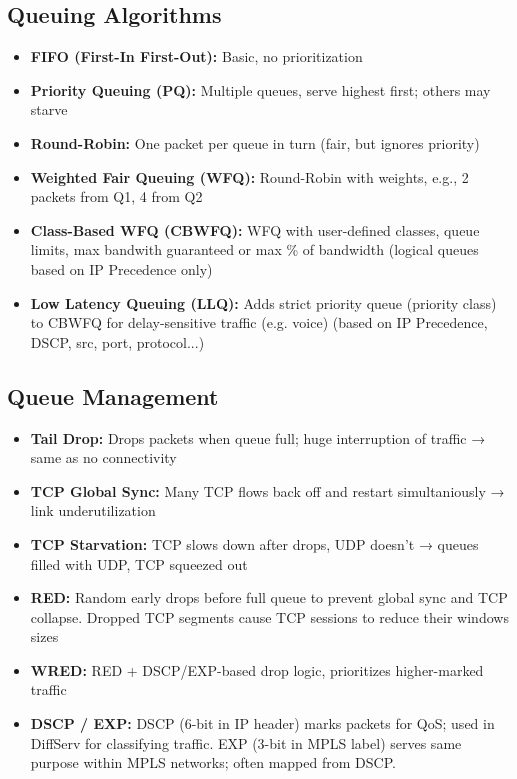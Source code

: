\begin{multicols*}{5}
		\subsection{Queuing Algorithms}
		\begin{itemize}
			\item \textbf{FIFO (First-In First-Out):} Basic, no prioritization
			\item \textbf{Priority Queuing (PQ):} Multiple queues, serve highest first; others may starve
			\item \textbf{Round-Robin:} One packet per queue in turn (fair, but ignores priority)
			\item \textbf{Weighted Fair Queuing (WFQ):} Round-Robin with weights, e.g., 2 packets from Q1, 4 from Q2
			\item \textbf{Class-Based WFQ (CBWFQ):} WFQ with user-defined classes, queue limits, max bandwith guaranteed or max \% of bandwidth (logical queues based on IP Precedence only)
			\item \textbf{Low Latency Queuing (LLQ):} Adds strict priority queue (priority class) to CBWFQ for delay-sensitive traffic (e.g. voice) (based on IP Precedence, DSCP, src, port, protocol...)
		\end{itemize}
		
		\subsection{Queue Management}
		\begin{itemize}
			\item \textbf{Tail Drop:} Drops packets when queue full; huge interruption of traffic → same as no connectivity
			\item \textbf{TCP Global Sync:} Many TCP flows back off and restart simultaniously → link underutilization
			\item \textbf{TCP Starvation:} TCP slows down after drops, UDP doesn't → queues filled with UDP, TCP squeezed out
			\item \textbf{RED:} Random early drops before full queue to prevent global sync and TCP collapse. Dropped TCP segments cause TCP sessions to reduce their windows sizes
			\item \textbf{WRED:} RED + DSCP/EXP-based drop logic, prioritizes higher-marked traffic
			\item \textbf{DSCP / EXP:} DSCP (6-bit in IP header) marks packets for QoS; used in DiffServ for classifying traffic. EXP (3-bit in MPLS label) serves same purpose within MPLS networks; often mapped from DSCP.
		\end{itemize}

\end{multicols*}

